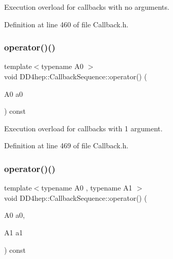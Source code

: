 Execution overload for callbacks with no arguments. 



Definition at line 460 of file Callback.\+h.

\hypertarget{struct_d_d4hep_1_1_callback_sequence_a8bdf601005b81230453fb957ea55444f}{}\label{struct_d_d4hep_1_1_callback_sequence_a8bdf601005b81230453fb957ea55444f} 
\subsubsection{\texorpdfstring{operator()()}{operator()()}\hspace{0.1cm}{\footnotesize\ttfamily [2/4]}}
{\footnotesize\ttfamily template$<$typename A0 $>$ \\
void D\+D4hep\+::\+Callback\+Sequence\+::operator() (\begin{DoxyParamCaption}\item[{A0}]{a0 }\end{DoxyParamCaption}) const\hspace{0.3cm}{\ttfamily [inline]}}



Execution overload for callbacks with 1 argument. 



Definition at line 469 of file Callback.\+h.

\hypertarget{struct_d_d4hep_1_1_callback_sequence_a0453de7821df59eb221ddab126681a26}{}\label{struct_d_d4hep_1_1_callback_sequence_a0453de7821df59eb221ddab126681a26} 
\subsubsection{\texorpdfstring{operator()()}{operator()()}\hspace{0.1cm}{\footnotesize\ttfamily [3/4]}}
{\footnotesize\ttfamily template$<$typename A0 , typename A1 $>$ \\
void D\+D4hep\+::\+Callback\+Sequence\+::operator() (\begin{DoxyParamCaption}\item[{A0}]{a0,  }\item[{A1}]{a1 }\end{DoxyParamCaption}) const\hspace{0.3cm}{\ttfamily [inline]}}



